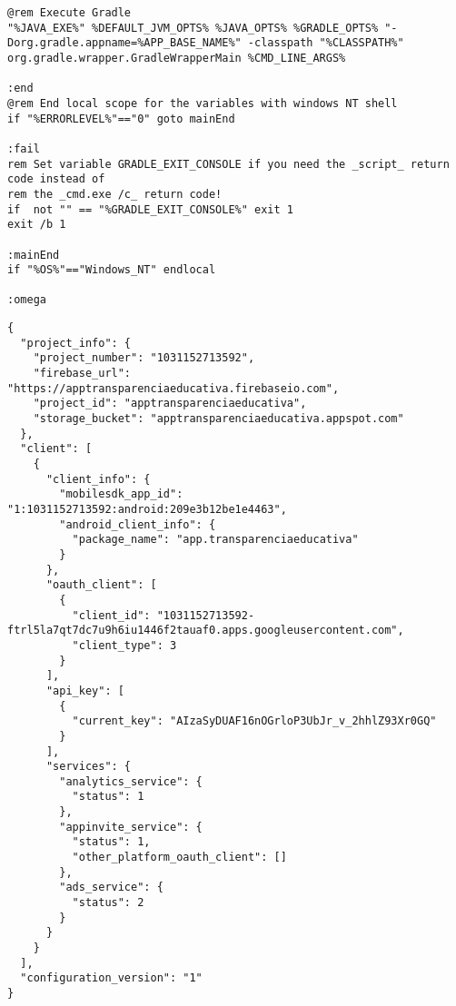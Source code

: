 \documentclass[12pt,a4paper]{article}
\begin{document}
\begin{lstlisting}[caption=./gradlew.bat]
@rem Execute Gradle
"%JAVA_EXE%" %DEFAULT_JVM_OPTS% %JAVA_OPTS% %GRADLE_OPTS% "-Dorg.gradle.appname=%APP_BASE_NAME%" -classpath "%CLASSPATH%" org.gradle.wrapper.GradleWrapperMain %CMD_LINE_ARGS%

:end
@rem End local scope for the variables with windows NT shell
if "%ERRORLEVEL%"=="0" goto mainEnd

:fail
rem Set variable GRADLE_EXIT_CONSOLE if you need the _script_ return code instead of
rem the _cmd.exe /c_ return code!
if  not "" == "%GRADLE_EXIT_CONSOLE%" exit 1
exit /b 1

:mainEnd
if "%OS%"=="Windows_NT" endlocal

:omega
\end{lstlisting}
\pagebreak

\begin{lstlisting}[caption=./mobile/google-services.json]
{
  "project_info": {
    "project_number": "1031152713592",
    "firebase_url": "https://apptransparenciaeducativa.firebaseio.com",
    "project_id": "apptransparenciaeducativa",
    "storage_bucket": "apptransparenciaeducativa.appspot.com"
  },
  "client": [
    {
      "client_info": {
        "mobilesdk_app_id": "1:1031152713592:android:209e3b12be1e4463",
        "android_client_info": {
          "package_name": "app.transparenciaeducativa"
        }
      },
      "oauth_client": [
        {
          "client_id": "1031152713592-ftrl5la7qt7dc7u9h6iu1446f2tauaf0.apps.googleusercontent.com",
          "client_type": 3
        }
      ],
      "api_key": [
        {
          "current_key": "AIzaSyDUAF16nOGrloP3UbJr_v_2hhlZ93Xr0GQ"
        }
      ],
      "services": {
        "analytics_service": {
          "status": 1
        },
        "appinvite_service": {
          "status": 1,
          "other_platform_oauth_client": []
        },
        "ads_service": {
          "status": 2
        }
      }
    }
  ],
  "configuration_version": "1"
}
\end{lstlisting}
\pagebreak
\end{document}
